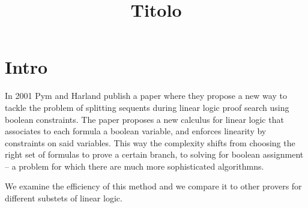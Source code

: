 \documentclass[a4paper, 12pt, tesi, english]{report}
\title{Titolo}
\begin{document}
\maketitle
\newpage
\tableofcontents

\chapter{Intro}
In 2001 Pym and Harland publish a paper \cite{HarlandPym} where they propose a new way to tackle the problem of splitting sequents during linear logic proof search using boolean constraints.
The paper proposes a new calculus for linear logic that associates to each formula a boolean variable, and enforces linearity by constraints on said variables.
This way the complexity shifts from choosing the right set of formulas to prove a certain branch, to solving for boolean assignment -- a problem for which there are much more sophisticated algorithmns.

We examine the efficiency of this method and we compare it to other provers for different substets of linear logic.
\end{document}
